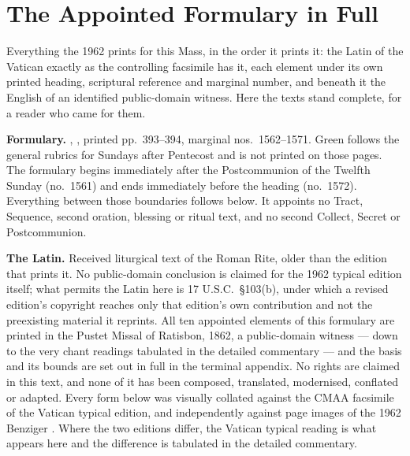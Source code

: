 \section*{The Appointed Formulary in Full}

Everything the 1962  prints for this Mass, in the order
it prints it: the Latin of the Vatican  exactly as the
controlling facsimile has it, each element under its own printed heading,
scriptural reference and marginal number, and beneath it the English of an
identified public-domain witness. Here the texts stand complete, for a
reader who came for them.

\textbf{Formulary.} ,
, printed pp.~393--394, marginal nos.\ 1562--1571. Green
follows the general rubrics for Sundays after Pentecost and is not printed on
those pages. The formulary begins immediately after the Postcommunion of the
Twelfth Sunday (no.\ 1561) and ends immediately before the heading
 (no.\ 1572). Everything
between those boundaries follows below. It appoints no Tract, Sequence, second
oration, blessing or ritual text, and no second Collect, Secret or
Postcommunion.

\textbf{The Latin.} Received liturgical text of the Roman Rite, older than the
edition that prints it. No public-domain conclusion is claimed for the 1962
typical edition itself; what permits the Latin here is 17 U.S.C.\ \S103(b),
under which a revised edition's copyright reaches only that edition's own
contribution and not the preexisting material it reprints. All ten appointed
elements of this formulary are printed in the Pustet Missal of Ratisbon, 1862,
a public-domain witness --- down to the very chant readings tabulated in the
detailed commentary --- and the basis and its
bounds are set out in full in the terminal appendix. No rights are claimed in
this text, and none of it has been composed, translated, modernised, conflated
or adapted. Every form below was visually collated
against the CMAA facsimile of the Vatican typical edition, and independently
against page images of the 1962 Benziger . Where
the two editions differ, the Vatican typical reading is what appears here and
the difference is tabulated in the detailed commentary.

